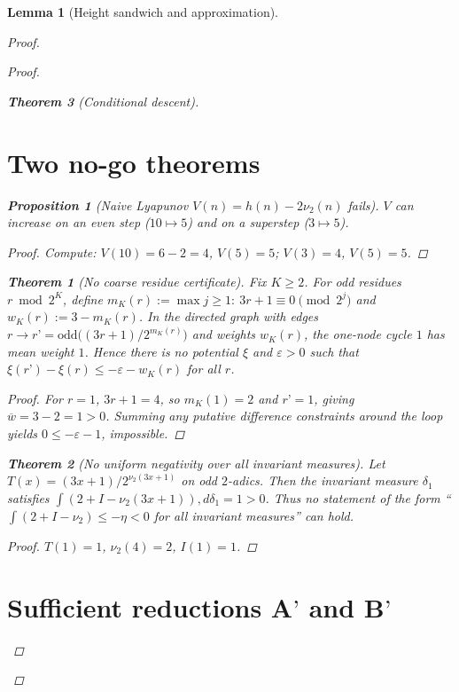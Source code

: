 \documentclass[reprint,aps,prd,showpacs,amsmath,amssymb,floatfix]{revtex4-2}
\newtheorem{theorem}{Theorem} \newtheorem{lemma}{Lemma} \newtheorem{proposition}{Proposition} \theoremstyle{remark} \newtheorem{remark}{Remark} \newtheorem{definition}{Definition}
\begin{document}
\begin{lemma}[Height sandwich and approximation]
\begin{proof}
\begin{proof}
\begin{theorem}[Conditional descent]
\section{Two no-go theorems}
\begin{proposition}[Naive Lyapunov $V(n)=h(n)-2\nu_2(n)$ fails]\label{prop:noV} $V$ can increase on an even step ($10\mapsto5$) and on a superstep ($3\mapsto5$). \end{proposition} \begin{proof} Compute: $V(10)=6-2=4$, $V(5)=5$; $V(3)=4$, $V(5)=5$. \end{proof}
\begin{theorem}[No coarse residue certificate]\label{thm:nocoarse} Fix $K\ge2$. For odd residues $r\bmod 2^K$, define $m_K(r):=\max{j\ge1:\ 3r+1\equiv0\pmod{2^j}}$ and $w_K(r):=3-m_K(r)$. In the directed graph with edges $r\to r’=\mathrm{odd}\big((3r+1)/2^{m_K(r)}\big)$ and weights $w_K(r)$, the one-node cycle ${1}$ has mean weight $1$. Hence there is no potential $\xi$ and $\varepsilon>0$ such that $\xi(r’)-\xi(r)\le -\varepsilon-w_K(r)$ for all $r$. \end{theorem} \begin{proof} For $r=1$, $3r+1=4$, so $m_K(1)=2$ and $r’=1$, giving $\overline w=3-2=1>0$. Summing any putative difference constraints around the loop yields $0\le -\varepsilon-1$, impossible. \end{proof}
\begin{theorem}[No uniform negativity over all invariant measures]\label{thm:nomeasureall} Let $T(x)=(3x+1)/2^{\nu_2(3x+1)}$ on odd $2$-adics. Then the invariant measure $\delta_1$ satisfies $\int(2+I-\nu_2(3x+1)),d\delta_1=1>0$. Thus no statement of the form “$\int(2+I-\nu_2)\le -\eta<0$ for all invariant measures” can hold. \end{theorem} \begin{proof} $T(1)=1$, $\nu_2(4)=2$, $I(1)=1$. \end{proof}
\section{Sufficient reductions A$’$ and B$’$}

\end{theorem}
\end{proof}
\end{proof}
\end{lemma}
\end{document}
